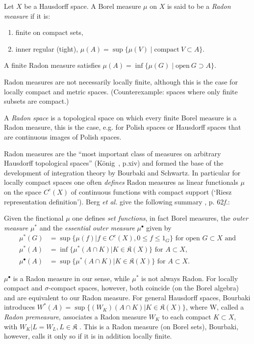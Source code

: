 \documentclass[12pt]{article}
\begin{document}
Let $X$ be a Hausdorff space. A Borel measure $\mu$ on $X$ is said to be a \emph{Radon measure} if it is:
\begin{enumerate}
\item finite on compact sets, 
\item inner regular (tight), $\mu(A) = \sup \{\mu (V) \mid \text{compact}\ V \subset A\}$.
\end{enumerate}
A finite Radon measure satisfies $\mu(A) = \inf \{\mu(G) \mid \text{open}\ G \supset A\}$.

Radon measures are not necessarily locally finite, although this is the case for locally compact and metric spaces. (Counterexample: spaces where only finite subsets are compact.) 

A \emph{Radon space} is a topological space on which every finite Borel measure is a Radon measure, this is the case, e.g. for Polish spaces or Hausdorff spaces that are continuous images of Polish spaces.


Radon measures are the ``most important class of measures on arbitrary Hausdorff topological spaces'' (K\"onig~\cite{koe97}, p.xiv) and formed the base of the development of integration theory by Bourbaki and Schwartz. In particular for locally compact spaces one often \emph{defines} Radon measures as linear functionals $\mu$ on the space $C^c(X)$ of continuous functions with compact support (`Riesz representation definition'). Berg \emph{et al.} give the following summary \cite{ber84}, p. 62\emph{f.}:

Given the finctional $\mu$ one defines \emph{set functions}, in fact Borel measures, the \emph{outer measure} $\mu^*$  and the \emph{essential outer measure} $\mu^\bullet$ given by \begin{alignat}
\mu^* (G) &= \sup \{\mu(f) | f\in C^c(X), 0 \le f \le 1_G\} \text{ for open }G\subset X\text{ and}\\
\mu^* (A) &= \inf\{\mu^* (A \cap K) | K \in \mathfrak{K} (X)\} \text{ for }A\subset X,\\
\mu^\bullet (A) &= \sup \{\mu^*(A \cap K) | K \in \mathfrak{K}(X)\} \text{ for }A\subset X.
\end{alignat}

$\mu^\bullet$ is a Radon measure in our sense, while $\mu^*$ is not always Radon. For locally compact and $\sigma$-compact spaces, however, both coincide (on the Borel algebra) and are equivalent to our Radon measure. For general Hausdorff spaces, Bourbaki introduces $W^* (A) = \sup \{(W_K)(A\cap K) | K\in \mathfrak{K}(X)\}$, where 
W, called a \emph{Radon premeasure}, associates a Radon measure $W_K$ to each compact $K \subset X$, with $W_K|L = W_L, L\in\mathfrak{K}$ . This is a Radon measure (on Borel sets), Bourbaki, however, calls it only so if it is in addition locally finite.
\end{document}
